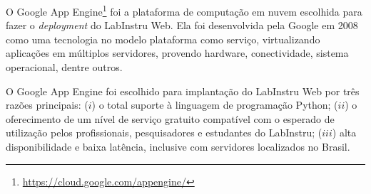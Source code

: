 O Google App Engine\footnote{\url{https://cloud.google.com/appengine/}} foi a plataforma de computação em nuvem escolhida para fazer o \emph{deployment} do LabInstru Web. Ela foi desenvolvida pela Google em 2008 como uma tecnologia no modelo plataforma como serviço, virtualizando aplicações em múltiplos servidores, provendo hardware, conectividade, sistema operacional, dentre outros.

O Google App Engine foi escolhido para implantação do LabInstru Web por três razões principais: ($i$) o total suporte à linguagem de programação Python; ($ii$) o oferecimento de um nível de serviço gratuito compatível com o esperado de utilização pelos profissionais, pesquisadores e estudantes do LabInstru; ($iii$) alta disponibilidade e baixa latência, inclusive com servidores localizados no Brasil.

